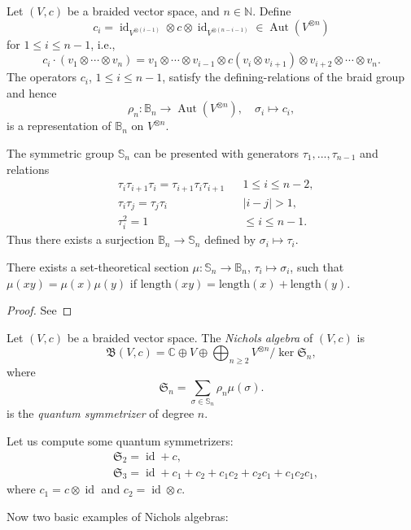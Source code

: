 \documentclass[graybox]{svmult}
\newcommand{\N}{\mathbb{N}}
\newcommand{\B}{\mathbb{B}}
\newcommand{\C}{\mathbb{C}}
\newcommand{\NA}{\mathfrak{B}}
\newcommand{\id}{\operatorname{id}}
\newcommand{\Aut}{\operatorname{Aut}}
\newcommand{\Sym}{\mathbb{S}}
\begin{document}
Let $(V,c)$ be a braided vector space, and $n\in\N$. Define
\[
c_{i}=\id_{V^{\otimes(i-1)}}\otimes c\otimes\id_{V^{\otimes(n-i-1)}}\in\Aut(V^{\otimes n})
\]
for $1\leq i\leq n-1$, i.e.,
\[
c_{i}\cdot(v_{1}\otimes\cdots\otimes v_{n})=v_{1}\otimes\cdots\otimes v_{i-1}\otimes c(v_{i}\otimes v_{i+1})\otimes v_{i+2}\otimes\cdots\otimes v_{n}.
\]
The operators $c_{i}$, $1\leq i\leq n-1$, satisfy the defining-relations of the
braid group and hence 
\[
	\rho_{n}:\B_{n}\to\Aut(V^{\otimes n}),
	\quad
	\sigma_i\mapsto c_i,
\]
is a representation of $\B_{n}$ on $V^{\otimes n}$.


The symmetric group $\Sym_{n}$ can be presented with generators 
$\tau_{1},...,\tau_{n-1}$ and relations
\begin{align*}
	&\tau_{i}\tau_{i+1}\tau_{i}=\tau_{i+1}\tau_{i}\tau_{i+1} &  & 1\leq i\leq n-2,\\
	&\tau_{i}\tau_{j}=\tau_{j}\tau_{i} &  & \ensuremath{|i-j|>1},\\
	&\tau_{i}^{2}=1 &  & \leq i\leq n-1.
\end{align*}
Thus there exists a surjection $\B_{n}\to\Sym_{n}$ defined by
$\sigma_{i}\mapsto\tau_{i}$. 

\begin{lemma}[Matsumoto]
	There exists a set-theoretical section $\mu:\mathbb{S}_{n}\to\mathbb{B}_{n}$,
	$\tau_{i}\mapsto\sigma_{i}$, such that $\mu(xy)=\mu(x)\mu(y)$ if
	$\mathrm{length}(xy)=\mathrm{length}(x)+\mathrm{length}(y)$. 
\end{lemma}

\begin{proof}
	See 
\end{proof}

Let $(V,c)$ be a braided vector space. The \emph{Nichols algebra} of $(V,c)$ is 
\[
\NA(V,c)=\C\oplus V\oplus \bigoplus_{n\geq2}V^{\otimes n}/\ker\mathfrak{S}_n,
\]
where 
\[
\mathfrak{S}_{n}=\sum_{\sigma\in\Sym_{n}}\rho_{n}\mu(\sigma).
\]
is the \emph{quantum symmetrizer} of degree $n$.

\begin{example}
	Let us compute some quantum symmetrizers:
	\begin{align*}
		&\mathfrak{S}_2 = \id+c,\\
		&\mathfrak{S}_3 = \id+c_{1}+c_{2}+c_{1}c_{2}+c_{2}c_{1}+c_{1}c_{2}c_{1},
	\end{align*}
	where $c_1=c\otimes\id$ and $c_2=\id\otimes c$. 
\end{example}

Now two basic examples of Nichols algebras:
\end{document}
